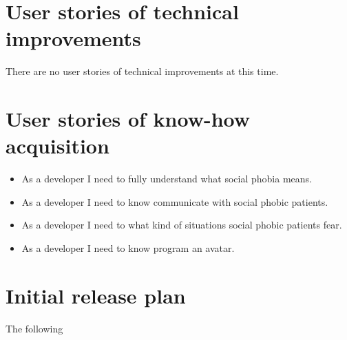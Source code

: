 \section{User stories of technical improvements}
There are no user stories of technical improvements at this time.

\section{User stories of know-how acquisition}
\begin{itemize}
\item As a developer I need to fully understand what social phobia means.
\item As a developer I need to know communicate with social phobic patients.
\item As a developer I need to what kind of situations social phobic patients fear.
\item As a developer I need to know program an \gls{avatar}.
\end{itemize}

\section{Initial release plan}
The following 
